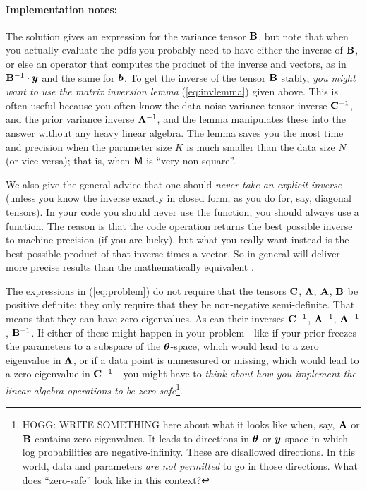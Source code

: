 \paragraph{Implementation notes:}
The solution gives an expression for the variance tensor $\mathbf{B}$, but
note that when you actually evaluate the pdfs you probably need to
have either the inverse of $\mathbf{B}$, or else an operator that computes
the product of the inverse and vectors, as in $\mathbf{B}^{-1}\cdot\boldsymbol{y}$ and
the same for $\boldsymbol{b}$.
To get the inverse of the tensor $\mathbf{B}$ stably, \emph{you might want to use
the matrix inversion lemma} (\ref{eq:invlemma}) given above.
This is often useful because you often know the data noise-variance
tensor inverse $\mathbf{C}^{-1}$, and the prior variance inverse
$\mathbf{\Lambda}^{-1}$, and the lemma manipulates these into the answer without
any heavy linear algebra.
The lemma saves you the most time and precision when the parameter size $K$
is much smaller than the data size $N$ (or vice versa); that is, when $\mathsf{M}$
is ``very non-square''.

We also give the general advice that one should \emph{never take an explicit
inverse} (unless you know the inverse exactly in closed form, as you do
for, say, diagonal tensors).
In your code you should never use the  function; you
should always use a  function.
The reason is that the code operation  returns the best
possible inverse to machine precision (if you are lucky), but what you
really want instead is the best possible product of that inverse times
a vector.
So in general  will deliver more precise results than
the mathematically equivalent .

The expressions in (\ref{eq:problem}) do not require that the tensors
$\mathbf{C}$, $\mathbf{\Lambda}$, $\mathbf{A}$, $\mathbf{B}$ be positive definite; they only require
that they be non-negative semi-definite.
That means that they can have zero eigenvalues.
As can their inverses $\mathbf{C}^{-1}$, $\mathbf{\Lambda}^{-1}$, $\mathbf{A}^{-1}$, $\mathbf{B}^{-1}$.
If either of these might happen in your problem---like if your prior
freezes the parameters to a subspace of the $\boldsymbol{\theta}$-space, which
would lead to a zero eigenvalue in $\mathbf{\Lambda}$, or if a data point is
unmeasured or missing, which would lead to a zero eigenvalue in
$\mathbf{C}^{-1}$---you might have to \emph{think about how you implement the
  linear algebra operations to be zero-safe}\footnote{HOGG: WRITE SOMETHING
  here about what it looks like when, say, $\mathbf{A}$ or $\mathbf{B}$ contains
  zero eigenvalues. It leads to directions in $\boldsymbol{\theta}$ or $\boldsymbol{y}$ space
  in which log probabilities are negative-infinity. These are
  disallowed directions. In this world, data and parameters \emph{are
    not permitted} to go in those directions. What does ``zero-safe''
  look like in this context?}.


